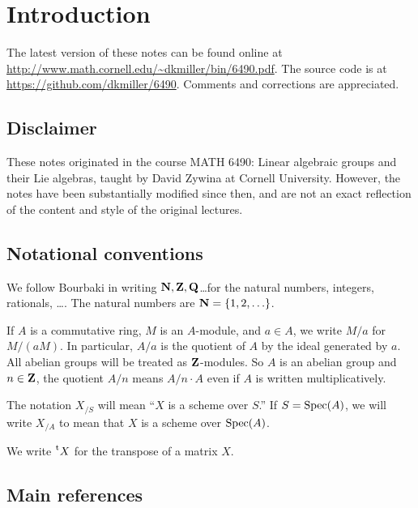 
\section{Introduction}





The latest version of these notes can be found online at 
\url{http://www.math.cornell.edu/~dkmiller/bin/6490.pdf}. The source code 
is at \url{https://github.com/dkmiller/6490}. Comments and corrections are 
appreciated. 





\subsection{Disclaimer}

These notes originated in the course MATH 6490: Linear algebraic groups and 
their Lie algebras, taught by David Zywina at Cornell University. However, the 
notes have been substantially modified since then, and are not an exact 
reflection of the content and style of the original lectures. 





\subsection{Notational conventions}

We follow Bourbaki in writing $\mathbf{N},\mathbf{Z},\mathbf{Q}$\ldots for the natural numbers, 
integers, rationals, \ldots. The natural numbers are $\mathbf{N}=\{1,2,\ldots\}$. 

If $A$ is a commutative ring, $M$ is an $A$-module, and $a\in A$, 
we write $M/a$ for $M/(a M)$. In particular, $A/a$ is the quotient of $A$ by 
the ideal generated by $a$. All abelian groups will be treated as 
$\mathbf{Z}$-modules. So $A$ is an abelian group and $n\in \mathbf{Z}$, the quotient 
$A/n$ means $A/n\cdot A$ even if $A$ is written multiplicatively. 

The notation $X_{/S}$ will mean ``$X$ is a scheme over $S$.'' If 
$S=\operatorname{Spec}(A)$, we will write $X_{/A}$ to mean that $X$ is a scheme over 
$\operatorname{Spec}(A)$. 

We write $\prescript{\mathrm{t}}{}{X}$ for the transpose of a matrix $X$. 





\subsection{Main references}

